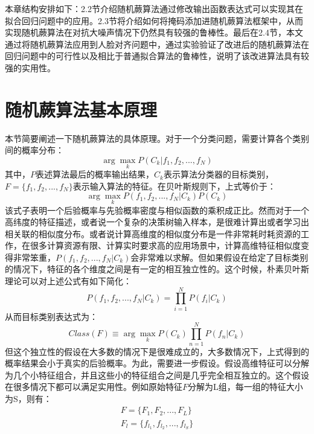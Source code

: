 本章结构安排如下：2.2节介绍随机蕨算法通过修改输出函数表达式可以实现其在拟合回归问题中的应用。2.3节将介绍如何将掩码添加进随机蕨算法框架中，从而实现随机蕨算法在对抗大噪声情况下仍然具有较强的鲁棒性。最后在2.4节，本文通过将随机蕨算法应用到人脸对齐问题中，通过实验验证了改进后的随机蕨算法在回归问题中的可行性以及相比于普通拟合算法的鲁棒性，说明了该改进算法具有较强的实用性。



\section{随机蕨算法基本原理}
本节简要阐述一下随机蕨算法的具体原理。对于一个分类问题，需要计算各个类别间的概率分布：
\begin{equation}
	\arg\max_{k} P(C_k|f_1,f_2,...,f_N)
\end{equation}
其中，$P$表述算法最后的概率输出结果，$C_k$表示算法分类器的目标类别，$F=\{f_1,f_2,...,f_N\}$表示输入算法的特征。在贝叶斯规则下，上式等价于：
\begin{equation}
	\arg\max_{k} P(f_1,f_2,...,f_N|C_k)P(C_k)
\end{equation}
该式子表明一个后验概率与先验概率密度与相似函数的乘积成正比。然而对于一个高纬度的特征描述，或者说一个复杂的决策树输入样本，是很难计算出或者学习出相关联的相似度分布。或者说计算高维度的相似度分布是一件非常耗时耗资源的工作，在很多计算资源有限、计算实时要求高的应用场景中，计算高维特征相似度变得非常笨重，$P(f_1,f_2,...,f_N|C_k)$会非常难以求解。但如果假设在给定了目标类别的情况下，特征的各个维度之间是有一定的相互独立性的。这个时候，朴素贝叶斯理论可以对上述公式有如下简化：
\begin{equation}
	P(f_1,f_2,...,f_N|C_k)=\prod_{i=1}^N P(f_i|C_k)
\end{equation}
从而目标类别表达式为：
\begin{equation}
	Class(F)\equiv \arg\max_k P(C_k)\prod_{n=1}^N P(f_n|C_k)
\end{equation}
但这个独立性的假设在大多数的情况下是很难成立的，大多数情况下，上式得到的概率结果会小于真实的后验概率。为此，需要进一步假设。假设高维特征可以分解为几个小特征组合，并且这些小的特征组合之间是几乎完全相互独立的。这个假设在很多情况下都可以满足实用性。例如原始特征$F$分解为L组，每一组的特征大小为S，则有：
\begin{equation}
\begin{aligned}
	F=\{F_1,F_2,...,F_L\} \\
	F_l=\{f_{l_1},f_{l_2},...,f_{l_S}\}
\end{aligned}
\end{equation}
